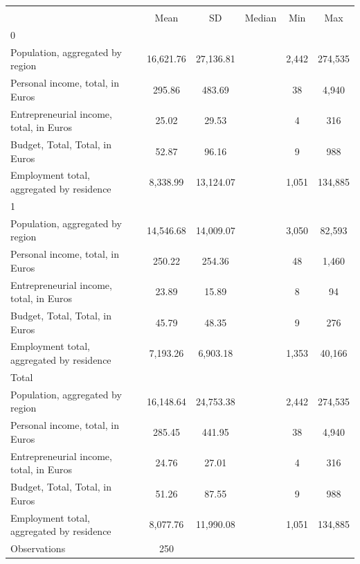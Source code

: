 {
\def\sym#1{\ifmmode^{#1}\else\(^{#1}\)\fi}
\begin{tabular}{l*{1}{ccccc}}
\toprule
                &\multicolumn{5}{c}{}                             \\
                &\multicolumn{1}{c}{{Mean}}&\multicolumn{1}{c}{{SD}}&\multicolumn{1}{c}{{Median}}&\multicolumn{1}{c}{{Min}}&\multicolumn{1}{c}{{Max}}\\
\midrule
0               &         &         &         &         &         \\
Population, aggregated by region&16,621.76&27,136.81&         &    2,442&  274,535\\
Personal income, total, in Euros&   295.86&   483.69&         &       38&    4,940\\
Entrepreneurial income, total, in Euros&    25.02&    29.53&         &        4&      316\\
Budget, Total, Total, in Euros&    52.87&    96.16&         &        9&      988\\
Employment total, aggregated by residence& 8,338.99&13,124.07&         &    1,051&  134,885\\
\midrule
1               &         &         &         &         &         \\
Population, aggregated by region&14,546.68&14,009.07&         &    3,050&   82,593\\
Personal income, total, in Euros&   250.22&   254.36&         &       48&    1,460\\
Entrepreneurial income, total, in Euros&    23.89&    15.89&         &        8&       94\\
Budget, Total, Total, in Euros&    45.79&    48.35&         &        9&      276\\
Employment total, aggregated by residence& 7,193.26& 6,903.18&         &    1,353&   40,166\\
\midrule
Total           &         &         &         &         &         \\
Population, aggregated by region&16,148.64&24,753.38&         &    2,442&  274,535\\
Personal income, total, in Euros&   285.45&   441.95&         &       38&    4,940\\
Entrepreneurial income, total, in Euros&    24.76&    27.01&         &        4&      316\\
Budget, Total, Total, in Euros&    51.26&    87.55&         &        9&      988\\
Employment total, aggregated by residence& 8,077.76&11,990.08&         &    1,051&  134,885\\
\midrule
Observations    &      250&         &         &         &         \\
\bottomrule
\end{tabular}
}
